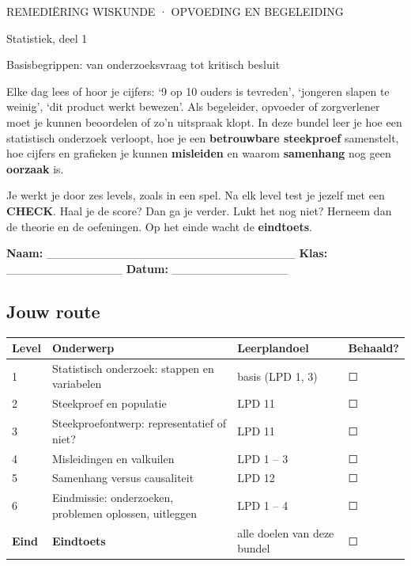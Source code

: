 \begin{banner}
REMEDIËRING WISKUNDE \quad· OPVOEDING EN BEGELEIDING
\end{banner}

\begin{titel}
Statistiek, deel 1
\end{titel}

\begin{ondertitel}
Basisbegrippen: van onderzoeksvraag tot kritisch besluit
\end{ondertitel}

Elke dag lees of hoor je cijfers: ‘9 op 10 ouders is tevreden’, ‘jongeren slapen te weinig’, ‘dit product werkt bewezen’. Als begeleider, opvoeder of zorgverlener moet je kunnen beoordelen of zo’n uitspraak klopt. In deze bundel leer je hoe een statistisch onderzoek verloopt, hoe je een \textbf{betrouwbare steekproef} samenstelt, hoe cijfers en grafieken je kunnen \textbf{misleiden} en waarom \textbf{samenhang} nog geen \textbf{oorzaak} is.

Je werkt je door zes levels, zoals in een spel. Na elk level test je jezelf met een \textbf{CHECK}. Haal je de score? Dan ga je verder. Lukt het nog niet? Herneem dan de theorie en de oefeningen. Op het einde wacht de \textbf{eindtoets}.

\textbf{Naam:} \_\_\_\_\_\_\_\_\_\_\_\_\_\_\_\_\_\_\_\_\_\_\_\_\_\_\_\_\_\_ \quad \textbf{Klas:} \_\_\_\_\_\_\_\_\_\_\_\_\_\_ \quad \textbf{Datum:} \_\_\_\_\_\_\_\_\_\_\_\_\_\_

\subsection*{Jouw route}

\begin{tabular}{llll}
\hline
Level & Onderwerp & Leerplandoel & Behaald? \\
\hline
1 & Statistisch onderzoek: stappen en variabelen & basis (LPD 1, 3) & ☐ \\
2 & Steekproef en populatie & LPD 11 & ☐ \\
3 & Steekproefontwerp: representatief of niet? & LPD 11 & ☐ \\
4 & Misleidingen en valkuilen & LPD 1 – 3 & ☐ \\
5 & Samenhang versus causaliteit & LPD 12 & ☐ \\
6 & Eindmissie: onderzoeken, problemen oplossen, uitleggen & LPD 1 – 4 & ☐ \\
\textbf{Eind} & \textbf{Eindtoets} & alle doelen van deze bundel & ☐ \\
\hline
\end{tabular}

